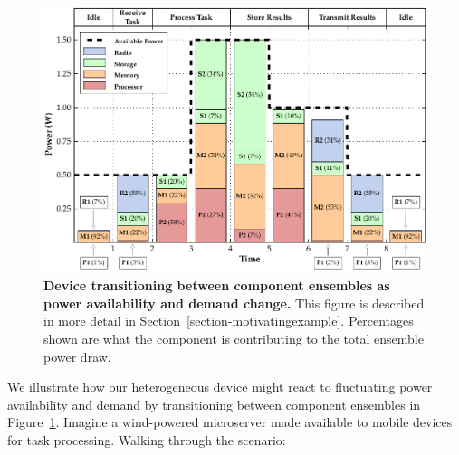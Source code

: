 \begin{figure}[t]
\centering
\includegraphics{./figures/transitiongraph.pdf}

\caption{\textbf{Device transitioning between component ensembles as power
availability and demand change.} This figure is described in more detail in
Section~\ref{section-motivatingexample}. Percentages shown are what the
component is contributing to the total ensemble power draw.}

\label{figure-transitiongraph}
\end{figure}

We illustrate how our heterogeneous device might react to fluctuating power
availability and demand by transitioning between component ensembles in
Figure~\ref{figure-transitiongraph}. Imagine a wind-powered microserver made
available to mobile devices for task processing. Walking through the
scenario:




